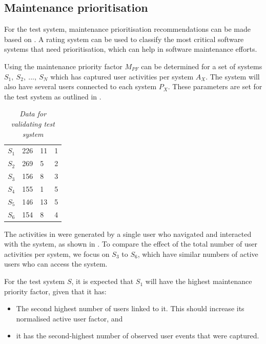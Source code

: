 \subsection{Maintenance prioritisation}
For the test system, maintenance prioritisation recommendations can be made based on . A rating system can be used to classify the most critical software systems that need prioritisation, which can help in software maintenance efforts. \par Using  the maintenance priority factor $M_{PF}$ can be determined for a set of systems {$S_1,~S_2,~...,~S_N$} which has captured user activities per system $A_X$. The system will also have several users connected to each system $P_X$. These parameters are set for the test system as outlined in .

\begin{table}[!htb]
	\centering
	\caption[Data for validating test system]
	{\textit{Data for validating test system}}
	\label{tbl:ch3_testData}
	\begin{tabularx}{\textwidth}{XXXX}
		\toprule
		\thead{System ($S_X$)} & \thead{Users per system ($P_X$)} & \thead{Number of events ($A_X$)} & \thead{Expected priority} \\
		\midrule
		\rowcolor{lightgray}
		$S_1$ & 226 & 11 & 1 \\
		$S_2$ & 269 & 5 & 2 \\
		\rowcolor{lightgray}
		$S_3$ & 156 & 8 & 3 \\
		$S_4$ & 155 & 1 & 5 \\
		\rowcolor{lightgray}
		$S_5$ & 146 & 13 & 5 \\
		$S_6$ & 154 & 8 & 4 \\
		\bottomrule
	\end{tabularx}
\end{table}

The activities in  were generated by a single user who navigated and interacted with the system, as shown in . To compare the effect of the total number of user activities per system, we focus on $S_3$ to $S_6$, which have similar numbers of active users who can access the system.\par For the test system $S$, it is expected that $S_1$ will have the highest maintenance priority factor, given that it has:

\begin{itemize}
	\item The second highest number of users linked to it. This should increase its normalised active user factor, and
	\item it has the second-highest number of observed user events that were captured.
\end{itemize}


